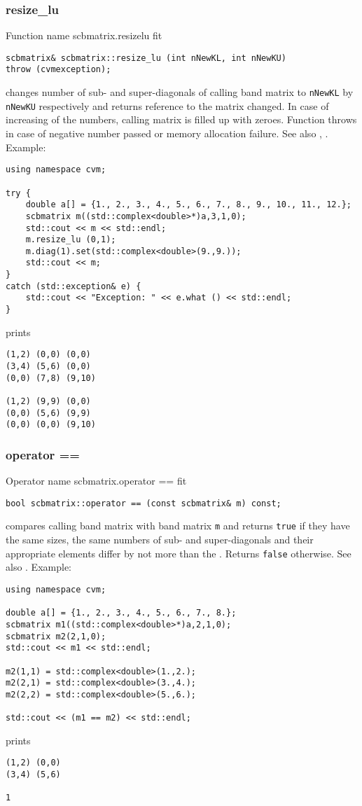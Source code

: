 \subsubsection{resize\_lu}
Function%
\pdfdest name {scbmatrix.resizelu} fit
\begin{verbatim}
scbmatrix& scbmatrix::resize_lu (int nNewKL, int nNewKU) 
throw (cvmexception);
\end{verbatim}
changes  number of sub- and super-diagonals 
of  calling band matrix to \verb"nNewKL" by \verb"nNewKU" respectively
and returns  reference to
the matrix changed. In case of increasing of the numbers, calling matrix
is filled up with zeroes. 
Function throws  
in case of negative number passed or memory allocation failure.
See also ,
.
Example:
\begin{Verbatim}
using namespace cvm;

try {
    double a[] = {1., 2., 3., 4., 5., 6., 7., 8., 9., 10., 11., 12.};
    scbmatrix m((std::complex<double>*)a,3,1,0);
    std::cout << m << std::endl;
    m.resize_lu (0,1);
    m.diag(1).set(std::complex<double>(9.,9.));
    std::cout << m;
}
catch (std::exception& e) {
    std::cout << "Exception: " << e.what () << std::endl;
}
\end{Verbatim}
prints
\begin{Verbatim}
(1,2) (0,0) (0,0)
(3,4) (5,6) (0,0)
(0,0) (7,8) (9,10)

(1,2) (9,9) (0,0)
(0,0) (5,6) (9,9)
(0,0) (0,0) (9,10)
\end{Verbatim}
\newpage





\subsubsection{operator ==}
Operator%
\pdfdest name {scbmatrix.operator ==} fit
\begin{verbatim}
bool scbmatrix::operator == (const scbmatrix& m) const;
\end{verbatim}
compares  calling band matrix with  band matrix \verb"m"
and returns \verb"true" if they have the same sizes, the same
numbers of sub- and super-diagonals 
and their appropriate elements differ by not more than the
.
Returns \verb"false" otherwise.
See also .
Example:
\begin{Verbatim}
using namespace cvm;

double a[] = {1., 2., 3., 4., 5., 6., 7., 8.};
scbmatrix m1((std::complex<double>*)a,2,1,0);
scbmatrix m2(2,1,0);
std::cout << m1 << std::endl;

m2(1,1) = std::complex<double>(1.,2.); 
m2(2,1) = std::complex<double>(3.,4.); 
m2(2,2) = std::complex<double>(5.,6.);

std::cout << (m1 == m2) << std::endl;
\end{Verbatim}
prints
\begin{Verbatim}
(1,2) (0,0)
(3,4) (5,6)

1
\end{Verbatim}
\newpage




